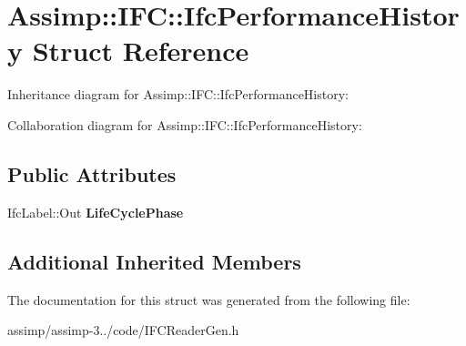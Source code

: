 \hypertarget{struct_assimp_1_1_i_f_c_1_1_ifc_performance_history}{\section{Assimp\+:\+:I\+F\+C\+:\+:Ifc\+Performance\+History Struct Reference}
\label{struct_assimp_1_1_i_f_c_1_1_ifc_performance_history}
}


Inheritance diagram for Assimp\+:\+:I\+F\+C\+:\+:Ifc\+Performance\+History\+:


Collaboration diagram for Assimp\+:\+:I\+F\+C\+:\+:Ifc\+Performance\+History\+:
\subsection*{Public Attributes}
\begin{DoxyCompactItemize}
\item 
\hypertarget{struct_assimp_1_1_i_f_c_1_1_ifc_performance_history_a0fc1a29e8002e013272de141dc361170}{Ifc\+Label\+::\+Out {\bfseries Life\+Cycle\+Phase}}\label{struct_assimp_1_1_i_f_c_1_1_ifc_performance_history_a0fc1a29e8002e013272de141dc361170}

\end{DoxyCompactItemize}
\subsection*{Additional Inherited Members}


The documentation for this struct was generated from the following file\+:\begin{DoxyCompactItemize}
\item 
assimp/assimp-\/3../code/I\+F\+C\+Reader\+Gen.\+h\end{DoxyCompactItemize}
